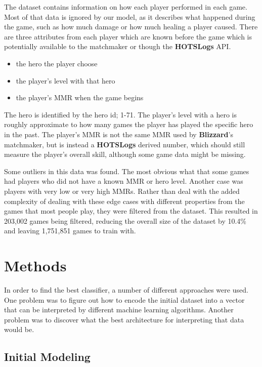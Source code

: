 \documentclass[twoside,twocolumn]{article}
\begin{document}
The dataset contains information on how each player performed in each game.  Most of that data is ignored by our model, as it describes what happened during the game, such as how much damage or how much healing a player caused.  There are three attributes from each player which are known before the game which is potentially available to the matchmaker or though the \textbf{HOTSLogs} API.

\begin{itemize}
\item the hero the player choose
\item the player's level with that hero
\item the player's MMR when the game begins
\end{itemize}

The hero is identified by the hero id; 1-71.  The player's level with a hero is roughly approximate to how many games the player has played the specific hero in the past.  The player's MMR is not the same MMR used by \textbf{Blizzard}'s matchmaker, but is instead a \textbf{HOTSLogs} derived number, which should still measure the player's overall skill, although some game data might be missing.

Some outliers in this data was found.  The most obvious what that some games had players who did not have a known MMR or hero level.  Another case was players with very low or very high MMRs.  Rather than deal with the added complexity of dealing with these edge cases with different properties from the games that most people play, they were filtered from the dataset.  This resulted in 203,002 games being filtered, reducing the overall size of the dataset by 10.4\% and leaving 1,751,851 games to train with.



\section{Methods}

In order to find the best classifier, a number of different approaches were used.  One problem was to figure out how to encode the initial dataset into a vector that can be interpreted by different machine learning algorithms.  Another problem was to discover what the best  architecture for interpreting that data would be.

\subsection{Initial Modeling}
\end{document}
